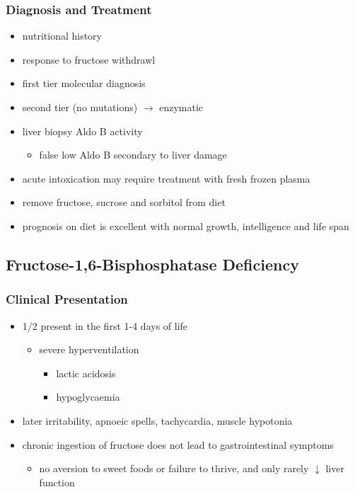 \documentclass{scrartcl}
\begin{document}
\subsubsection{Diagnosis and Treatment}
\label{sec:org215ceaa}
\begin{itemize}
\item nutritional history
\item response to fructose withdrawl
\item first tier molecular diagnosis
\item second tier (no mutations) \(\to\) enzymatic
\item liver biopsy Aldo B activity
\begin{itemize}
\item false low Aldo B secondary to liver damage
\end{itemize}
\item acute intoxication may require treatment with fresh frozen plasma
\item remove fructose, sucrose and sorbitol from diet
\item prognosis on diet is excellent with normal growth,
intelligence and life span
\end{itemize}

\subsection{Fructose-1,6-Bisphosphatase Deficiency}
\label{sec:org2a805d7}
\subsubsection{Clinical Presentation}
\label{sec:org6fedb8a}
\begin{itemize}
\item 1/2 present in the first 1-4 days of life
\begin{itemize}
\item severe hyperventilation
\begin{itemize}
\item lactic acidosis
\item hypoglycaemia
\end{itemize}
\end{itemize}
\item later irritability, apnoeic spells, tachycardia, muscle hypotonia
\item chronic ingestion of fructose does not lead to gastrointestinal symptoms
\begin{itemize}
\item no aversion to sweet foods or failure to thrive, and only rarely \(\downarrow\) liver function
\end{itemize}
\end{itemize}
\end{document}
